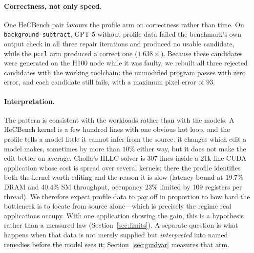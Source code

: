 \paragraph{Correctness, not only speed.}
One HeCBench pair favours the profile arm on correctness rather than time. On
\texttt{background-subtract}, GPT-5 without profile data failed the benchmark's own output check in
all three repair iterations and produced no usable candidate, while the \texttt{pcrl} arm produced a
correct one ($1.638\times$). Because these candidates were generated on the H100 node while it was
faulty, we rebuilt all three rejected candidates with the working toolchain: the unmodified program
passes with zero error, and each candidate still fails, with a maximum pixel error of $93$.

\paragraph{Interpretation.}
The pattern is consistent with the workloads rather than with the models. A HeCBench kernel is a few
hundred lines with one obvious hot loop, and the profile tells a model little it cannot infer from the
source: it changes which edit a model makes, sometimes by more than $10\%$ either way, but it does not
make the edit better on average. Cholla's HLLC solver is 307 lines inside a 21k-line CUDA application whose cost is spread over
several kernels; there the profile identifies both the kernel worth editing and the reason it is slow
(latency-bound at $19.7\%$ DRAM and $40.4\%$ SM throughput, occupancy $23\%$ limited by 109 registers
per thread). We therefore expect profile data to pay off in proportion to how hard the bottleneck is to
locate from source alone---which is precisely the regime real applications occupy. With one
application showing the gain, this is a hypothesis rather than a measured law
(Section~\ref{sec:limits}).
A separate question is what happens when that data is not merely supplied but \emph{interpreted} into
named remedies before the model sees it; Section~\ref{sec:guidvar} measures that arm.

